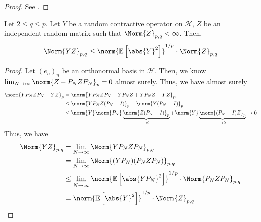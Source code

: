 \begin{proof}
  See \cite{huang2020matrix}.
\end{proof}


\begin{corl}
    Let \( 2 \leq q \leq p \). Let \( Y \) be a random contractive operator on \( \mathcal{H} \), \( Z \) be an independent random matrix such that \( \Norm{Z}_{p,q}<\infty  \). Then,
    \[ \Norm{YZ}_{p,q} \leq \norm{\mathbb{E}\left[ \abs{Y}^{2}\right]}_{}^{1/p} \cdot \Norm{Z}_{p,q} \]
\end{corl}

\begin{proof}
    Let \( (e_n)_n \) be an orthonormal basis in \( \mathcal{H} \). Then, we know \( \lim_{N \to \infty} \norm{Z-P_NZP_N}_{p}=0 \) almost surely. Thus, we have almost surely 
    \begin{align*}
      \norm{YP_NZP_N-YZ}_{p} &= \norm{YP_NZP_N-YP_NZ+YP_NZ-YZ}_{p} \\
                             &\leq \norm{YP_NZ(P_N-I)}_{p}+ \norm{Y(P_N-I)}_{p} \\
                             &\leq \norm{Y}_{} \norm{P_N}_{}\underbrace{\norm{Z(P_N-I)}_{p}}_{\to 0}+ \norm{Y}\underbrace{\norm{(P_N-I)Z}_{p}}_{\to 0} \to 0
    \end{align*}
    Thus, we have 
    \begin{align*}
      \Norm{YZ}_{p,q} &= \lim_{N \to \infty} \Norm{YP_NZP_N}_{p,q} \\
                      &= \lim_{N \to \infty} \Norm{(YP_N)(P_NZP_N)}_{p,q} \\
                      &\leq \varliminf_{N \to \infty} \norm{\mathbb{E}\left[\abs{YP_N}^{2}\right]}_{}^{1/p} \cdot\Norm{P_NZP_N}_{p,q} \\
                      & = \norm{\mathbb{E}\left[\abs{Y}^{2}\right]}_{}^{1/p} \cdot \Norm{Z}_{p,q}
    \end{align*}
    
\end{proof}


